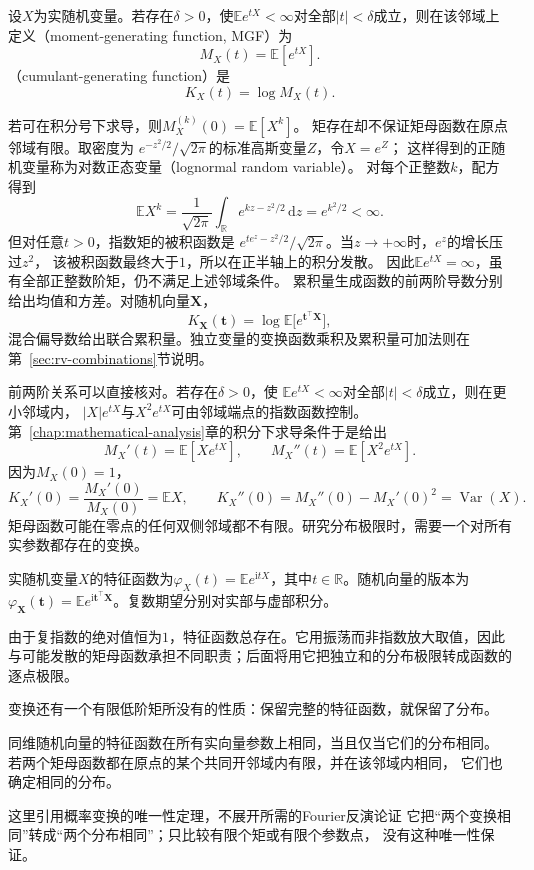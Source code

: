 \begin{definition}[矩母函数与累积量生成函数]
  \label{def:probability-moment-generating-functions}
设\(X\)为实随机变量。若存在\(\delta>0\)，使\(\mathbb E e^{tX}<\infty\)对全部\(|t|<\delta\)成立，则在该邻域上定义（moment-generating function, MGF）为
\[ M_X(t)=\mathbb{E}[e^{tX}]. \]
（cumulant-generating function）是
\[ K_X(t)=\log M_X(t). \]
\end{definition}
若可在积分号下求导，则\(M_X^{(k)}(0)=\mathbb{E}[X^k]\)。
矩存在却不保证矩母函数在原点邻域有限。取密度为
\(e^{-z^2/2}/\sqrt{2\pi}\)的标准高斯变量\(Z\)，令\(X=e^Z\)；
这样得到的正随机变量称为对数正态变量（lognormal random variable）。
对每个正整数\(k\)，配方得到
\[
 \mathbb E X^k
 =\frac1{\sqrt{2\pi}}\int_{\mathbb R}e^{kz-z^2/2}\,\mathrm dz
 =e^{k^2/2}<\infty.
\]
但对任意\(t>0\)，指数矩的被积函数是
\(e^{te^z-z^2/2}/\sqrt{2\pi}\)。当\(z\to+\infty\)时，\(e^z\)的增长压过\(z^2\)，
该被积函数最终大于\(1\)，所以在正半轴上的积分发散。
因此\(\mathbb E e^{tX}=\infty\)，虽有全部正整数阶矩，仍不满足上述邻域条件。
累积量生成函数的前两阶导数分别给出均值和方差。对随机向量\(\bm{X}\)，
\[ K_{\bm{X}}(\bm{t})
  =\log\mathbb{E}\bigl[e^{\bm{t}^{\top}\bm{X}}\bigr], \]
混合偏导数给出联合累积量。独立变量的变换函数乘积及累积量可加法则在第~\ref{sec:rv-combinations}节说明。

前两阶关系可以直接核对。若存在\(\delta>0\)，使
\(\mathbb E e^{tX}<\infty\)对全部\(|t|<\delta\)成立，则在更小邻域内，
\(|X|e^{tX}\)与\(X^2e^{tX}\)可由邻域端点的指数函数控制。第~\ref{chap:mathematical-analysis}章的积分下求导条件于是给出
\[
  M_X'(t)=\mathbb{E}[Xe^{tX}],\qquad
  M_X''(t)=\mathbb{E}[X^2e^{tX}].
\]
因为\(M_X(0)=1\)，
\[
  K_X'(0)=\frac{M_X'(0)}{M_X(0)}=\mathbb{E}X,
  \qquad
  K_X''(0)
  =M_X''(0)-M_X'(0)^2
  =\operatorname{Var}(X).
\]
矩母函数可能在零点的任何双侧邻域都不有限。研究分布极限时，需要一个对所有实参数都存在的变换。
\begin{definition}[特征函数]
  \label{def:probability-characteristic-function}
实随机变量\(X\)的特征函数为\(\varphi_X(t)=\mathbb E e^{\mathrm i tX}\)，其中\(t\in\mathbb R\)。随机向量的版本为\(\varphi_{\bm X}(\bm t)=\mathbb E e^{\mathrm i\bm t^\top\bm X}\)。复数期望分别对实部与虚部积分。
\end{definition}
由于复指数的绝对值恒为\(1\)，特征函数总存在。它用振荡而非指数放大取值，因此与可能发散的矩母函数承担不同职责；后面将用它把独立和的分布极限转成函数的逐点极限。

变换还有一个有限低阶矩所没有的性质：保留完整的特征函数，就保留了分布。
\begin{theorem}[变换函数的分布唯一性]
\label{thm:rv-transform-uniqueness}
同维随机向量的特征函数在所有实向量参数上相同，当且仅当它们的分布相同。
若两个矩母函数都在原点的某个共同开邻域内有限，并在该邻域内相同，
它们也确定相同的分布。
\end{theorem}
这里引用概率变换的唯一性定理，不展开所需的Fourier反演论证
它把“两个变换相同”转成“两个分布相同”；只比较有限个矩或有限个参数点，
没有这种唯一性保证。

